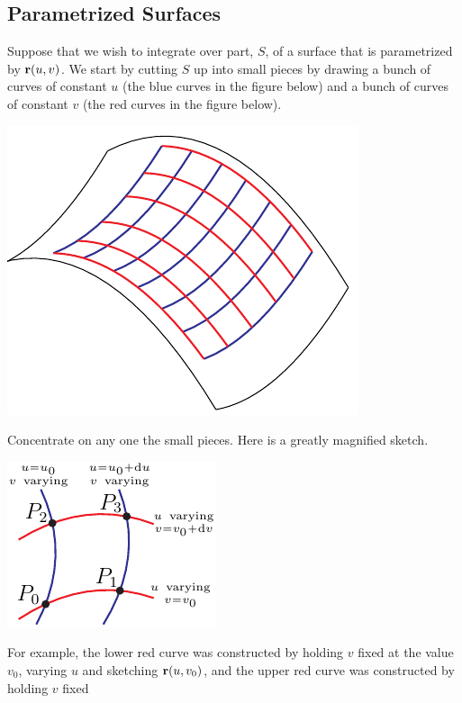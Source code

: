 \subsection{Parametrized Surfaces}\label{subsec:paramSurfaces}
Suppose that we wish to integrate over part, $S$, of a surface that is
parametrized by $\mathbf{r}(u,v)$. We start by cutting $S$ up into small pieces
by drawing a bunch of curves of constant $u$ (the blue curves in the
figure below) and a bunch of curves of constant $v$ (the red curves in the
figure below).
\begin{nfig}
\begin{center}
    \includegraphics[scale=0.7]{surfaceSlice.pdf}
\end{center}
\end{nfig}
Concentrate on any one the small pieces. Here is a greatly magnified
sketch.
\begin{nfig}
\begin{center}
    \includegraphics{dS.pdf}
\end{center}
\end{nfig}
For example, the  lower red curve was constructed by holding $v$ fixed 
at the value $v_0$, varying $u$ and sketching $\mathbf{r}(u,v_0)$, and 
the  upper red curve was constructed by holding $v$ fixed 
